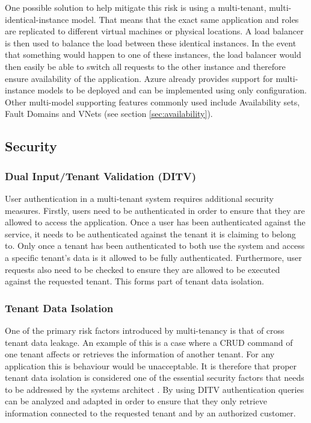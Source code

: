 One possible solution to help mitigate this risk is using a multi-tenant, multi-identical-instance model. That means that the exact same application and roles are replicated to different virtual machines or physical locations. A load balancer is then used to balance the load between these identical instances. In the event that something would happen to one of these instances, the load balancer would then easily be able to switch all requests to the other instance and therefore ensure availability of the application. Azure already provides support for multi-instance models to be deployed and can be implemented using only configuration. Other multi-model supporting features commonly used include Availability sets, Fault Domains and VNets (see section \ref{sec:availability}).


\subsection{Security}
\label{sec:security} 

\subsubsection{Dual Input/Tenant Validation (DITV)}

User authentication in a multi-tenant system requires additional security measures. Firstly, users need to be authenticated in order to ensure that they are allowed to access the application. Once a user has been authenticated against the service, it needs to be authenticated against the tenant it is claiming to belong to. Only once a tenant has been authenticated to both use the system and access a specific tenant's data is it allowed to be fully authenticated. Furthermore, user requests also need to be checked to ensure they are allowed to be executed against the requested tenant. This forms part of tenant data isolation.


\subsubsection{Tenant Data Isolation}
One of the primary risk factors introduced by multi-tenancy is that of cross tenant data leakage. An example of this is a case where a CRUD command of one tenant affects or retrieves the information of another tenant. For any application this is behaviour would be unacceptable. It is therefore that proper tenant data isolation is considered one of the essential security factors that needs to be addressed by the systems architect \cite{Wilder2012-so}. By using DITV authentication queries can be analyzed and adapted in order to ensure that they only retrieve information connected to the requested tenant and by an authorized customer.


